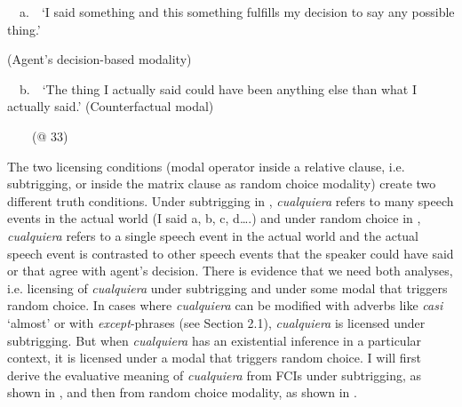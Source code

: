 \begin{styleStandard}
\ \ a.\ \ ‘I said something and this something fulfills my decision to say any possible thing.’ 
\end{styleStandard}

\begin{styleStandard}
(Agent’s decision-based modality)
\end{styleStandard}

\begin{styleStandard}
\ \ b.\ \ ‘The thing I actually said could have been anything else than what I actually said.’ (Counterfactual modal) 
\end{styleStandard}

\begin{styleStandard}
\ \ \ \ (@ 33)
\end{styleStandard}

\begin{styleStandard}
The two licensing conditions (modal operator inside a relative clause, i.e. subtrigging, or inside the matrix clause as random choice modality) create two different truth conditions. Under subtrigging in , \textit{cualquiera} refers to many speech events in the actual world (I said a, b, c, d….) and under random choice in , \textit{cualquiera} refers to a single speech event in the actual world and the actual speech event is contrasted to other speech events that the speaker could have said or that agree with agent’s decision. There is evidence that we need both analyses, i.e. licensing of \textit{cualquiera} under subtrigging and under some modal that triggers random choice. In cases where \textit{cualquiera} can be modified with adverbs like \textit{casi} ‘almost’ or with \textit{except}{}-phrases (see Section 2.1), \textit{cualquiera} is licensed under subtrigging. But when \textit{cualquiera} has an existential inference in a particular context, it is licensed under a modal that triggers random choice. I will first derive the evaluative meaning of \textit{cualquiera} from FCIs under subtrigging, as shown in , and then from random choice modality, as shown in .
\end{styleStandard}


